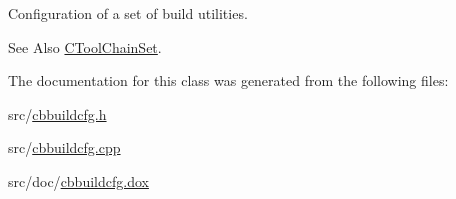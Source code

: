 Configuration of a set of build utilities. 

\begin{DoxySeeAlso}{See Also}
\hyperlink{classCToolChainSet}{C\-Tool\-Chain\-Set}. 
\end{DoxySeeAlso}


The documentation for this class was generated from the following files\-:\begin{DoxyCompactItemize}
\item 
src/\hyperlink{cbbuildcfg_8h}{cbbuildcfg.\-h}\item 
src/\hyperlink{cbbuildcfg_8cpp}{cbbuildcfg.\-cpp}\item 
src/doc/\hyperlink{cbbuildcfg_8dox}{cbbuildcfg.\-dox}\end{DoxyCompactItemize}
